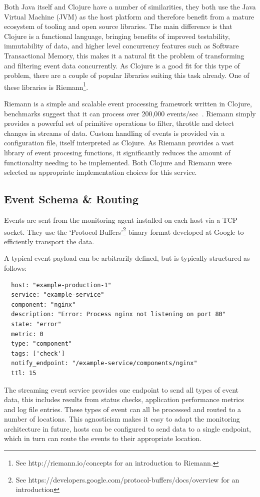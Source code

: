 \documentclass{cshonours}
\begin{document}
Both Java itself and Clojure have a number of similarities, they both use the Java Virtual Machine (JVM) as the host platform and therefore benefit from a mature ecosystem of tooling and open source libraries. The main difference is that Clojure is a functional language, bringing benefits of improved testability, immutability of data, and higher level concurrency features such as Software Transactional Memory, this makes it a natural fit the problem of transforming and filtering event data concurrently. As Clojure is a good fit for this type of problem, there are a couple of popular libraries suiting this task already. One of these libraries is Riemann\footnote{See http://riemann.io/concepts for an introduction to Riemann.}.

Riemann is a simple and scalable event processing framework written in Clojure, benchmarks suggest that it can process over 200,000 events/sec~\cite{Aphyr200k}. Riemann simply provides a powerful set of primitive operations to filter, throttle and detect changes in streams of data. Custom handling of events is provided via a configuration file, itself interpreted as Clojure. As Riemann provides a vast library of event procesing functions, it significantly reduces the amount of functionality needing to be implemented. Both Clojure and Riemann were selected as appropriate implementation choices for this service.

\subsection{Event Schema \& Routing}

Events are sent from the monitoring agent installed on each host via a TCP socket. They use the `Protocol Buffers'\footnote{See https://developers.google.com/protocol-buffers/docs/overview for an introduction} binary format developed at Google to efficiently transport the data.

A typical event payload can be arbitrarily defined, but is typically structured as follows:

\begin{verbatim}
  host: "example-production-1"
  service: "example-service"
  component: "nginx"
  description: "Error: Process nginx not listening on port 80"
  state: "error"
  metric: 0
  type: "component"
  tags: ['check']
  notify_endpoint: "/example-service/components/nginx"
  ttl: 15
\end{verbatim}

The streaming event service provides one endpoint to send all types of event data, this includes results from status checks, application performance metrics and log file entries. These types of event can all be processed and routed to a number of locations. This agnosticism makes it easy to adapt the monitoring architecture in future, hosts can be configured to send data to a single endpoint, which in turn can route the events to their appropriate location.
\end{document}
